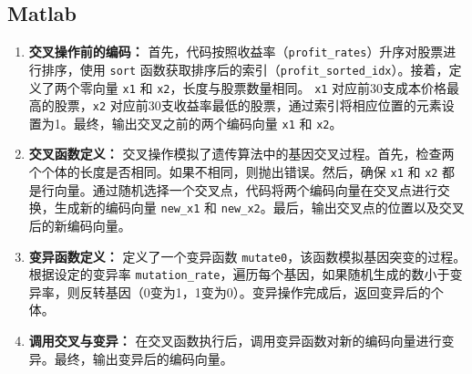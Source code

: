 \documentclass[journal,twoside,web]{ieeecolor}
\begin{document}
\subsection{Matlab}
\begin{enumerate}
    \item \textbf{交叉操作前的编码：} 
    首先，代码按照收益率（\texttt{profit\_rates}）升序对股票进行排序，使用 \texttt{sort} 函数获取排序后的索引（\texttt{profit\_sorted\_idx}）。接着，定义了两个零向量 \texttt{x1} 和 \texttt{x2}，长度与股票数量相同。 \texttt{x1} 对应前30支成本价格最高的股票，\texttt{x2} 对应前30支收益率最低的股票，通过索引将相应位置的元素设置为1。最终，输出交叉之前的两个编码向量 \texttt{x1} 和 \texttt{x2}。

    \item \textbf{交叉函数定义：} 
    交叉操作模拟了遗传算法中的基因交叉过程。首先，检查两个个体的长度是否相同。如果不相同，则抛出错误。然后，确保 \texttt{x1} 和 \texttt{x2} 都是行向量。通过随机选择一个交叉点，代码将两个编码向量在交叉点进行交换，生成新的编码向量 \texttt{new\_x1} 和 \texttt{new\_x2}。最后，输出交叉点的位置以及交叉后的新编码向量。

    \item \textbf{变异函数定义：} 
    定义了一个变异函数 \texttt{mutate0}，该函数模拟基因突变的过程。根据设定的变异率 \texttt{mutation\_rate}，遍历每个基因，如果随机生成的数小于变异率，则反转基因（0变为1，1变为0）。变异操作完成后，返回变异后的个体。

    \item \textbf{调用交叉与变异：} 
    在交叉函数执行后，调用变异函数对新的编码向量进行变异。最终，输出变异后的编码向量。
\end{enumerate}
\end{document}
